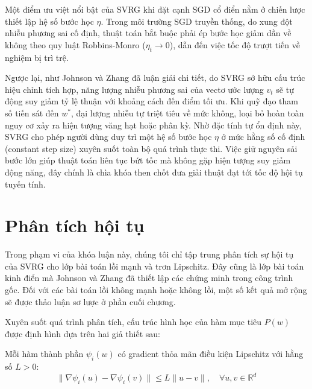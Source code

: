 Một điểm ưu việt nổi bật của SVRG khi đặt cạnh SGD cổ điển nằm ở chiến lược thiết lập hệ số bước học $\eta$. Trong môi trường SGD truyền thống, do xung đột nhiễu phương sai cố định, thuật toán bắt buộc phải ép bước học giảm dần về không theo quy luật Robbins-Monro ($\eta_t \to 0$), dẫn đến việc tốc độ trượt tiến về nghiệm bị trì trệ. 

Ngược lại, như Johnson và Zhang \cite{johnson2013accelerating} đã luận giải chi tiết, do SVRG sở hữu cấu trúc hiệu chỉnh tích hợp, năng lượng nhiễu phương sai của vectơ ước lượng $v_t$ sẽ tự động suy giảm tỷ lệ thuận với khoảng cách đến điểm tối ưu. Khi quỹ đạo tham số tiến sát đến $w^*$, đại lượng nhiễu tự triệt tiêu về mức không, loại bỏ hoàn toàn nguy cơ xảy ra hiện tượng văng hạt hoặc phân kỳ. Nhờ đặc tính tự ổn định này, SVRG cho phép người dùng duy trì một hệ số bước học $\eta$ ở mức hằng số cố định (constant step size) xuyên suốt toàn bộ quá trình thực thi. Việc giữ nguyên sải bước lớn giúp thuật toán liên tục bứt tốc mà không gặp hiện tượng suy giảm động năng, đây chính là chìa khóa then chốt đưa giải thuật đạt tới tốc độ hội tụ tuyến tính.

\section{Phân tích hội tụ}

Trong phạm vi của khóa luận này, chúng tôi chỉ tập trung phân tích sự hội tụ của SVRG cho lớp bài toán lồi mạnh và trơn Lipschitz. Đây cũng là lớp bài toán kinh điển mà Johnson và Zhang \cite{johnson2013accelerating} đã thiết lập các chứng minh trong công trình gốc. Đối với các bài toán lồi không mạnh hoặc không lồi, một số kết quả mở rộng sẽ được thảo luận sơ lược ở phần cuối chương.


Xuyên suốt quá trình phân tích, cấu trúc hình học của hàm mục tiêu $P(w)$ được định hình dựa trên hai giả thiết sau:

\begin{assumption}
\label{ass:smooth}
Mỗi hàm thành phần $\psi_i(w)$ có gradient thỏa mãn điều kiện Lipschitz với hằng số $L > 0$:
\begin{equation}
\|\nabla \psi_i(u) - \nabla \psi_i(v)\| \le L \|u - v\|, \quad \forall u, v \in \mathbb{R}^d
\end{equation}
\end{assumption}

